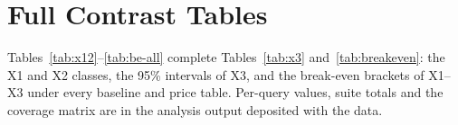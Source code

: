 \documentclass[sigconf]{acmart}
\begin{document}



\clearpage
\appendix

\section{Full Contrast Tables}
\label{app:tables}
Tables~\ref{tab:x12}--\ref{tab:be-all} complete Tables~\ref{tab:x3} and~\ref{tab:breakeven}: the X1 and X2 classes,
the 95\% intervals of X3, and the break-even brackets of X1--X3 under every baseline and price table. Per-query
values, suite totals and the coverage matrix are in the analysis output deposited with the data.
\end{document}
